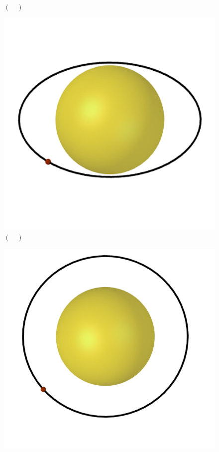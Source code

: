 \documentclass[a4paper, 12pt]{article}
\begin{document}
\begin{flushleft}
\begin{itemize}
\begin{itemize}
\begin{multicols}{3}
\begin{figure}[H]
							\captionsetup{labelformat=empty}
							\caption{$(\quad)$}
						\end{figure}
						\begin{figure}[H]
							\centering
							\includegraphics[scale=0.2]{./img/5b4.png}
							\captionsetup{labelformat=empty}
							\caption{$(\quad)$}
						\end{figure}
						\begin{figure}[H]
							\centering
							\includegraphics[scale=0.2]{./img/5b5.png}

\end{figure}
\end{multicols}
\end{itemize}
\end{itemize}
\end{flushleft}
\end{document}
